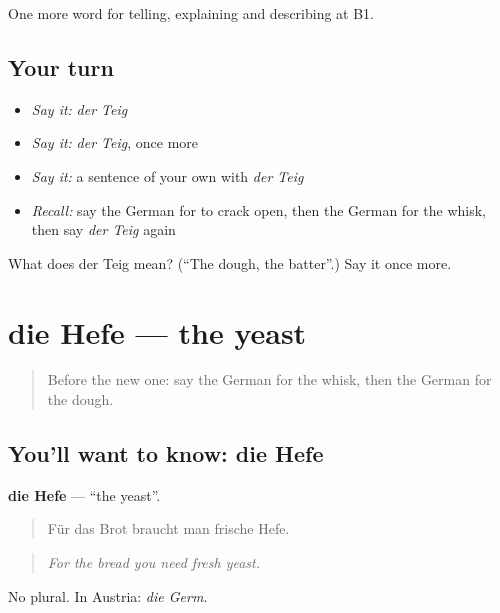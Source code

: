 \begin{grammarlens}[title={What you've built}]
One more word for telling, explaining and describing at B1.
\end{grammarlens}

\subsection*{Your turn}
\begin{itemize}
\raggedright
  \item \emph{Say it:} \emph{der Teig}
  \item \emph{Say it:} \emph{der Teig}, once more
  \item \emph{Say it:} a sentence of your own with \emph{der Teig}
  \item \emph{Recall:} say the German for to crack open, then the German for the whisk, then say \emph{der Teig} again
\end{itemize}

\begin{tcolorbox}[breakable,colback=teal!4,colframe=teal!35!black,title={Before you move on}]
What does der Teig mean? (\textquotedblleft{}The dough, the batter\textquotedblright{}.) Say it once more.
\end{tcolorbox}
\section[die Hefe]{die Hefe — the yeast}

\label{lesson:GE-C325-hefe}



\begin{quote}
Before the new one: say the German for the whisk, then the German for the dough.
\end{quote}

\subsection*{You'll want to know: die Hefe}
\textbf{die Hefe} — \textquotedblleft{}the yeast\textquotedblright{}.

\begin{quote}
Für das Brot braucht man frische Hefe.
\end{quote}

\begin{quote}
\emph{For the bread you need fresh yeast.}
\end{quote}

No plural. In Austria: \emph{die Germ}.


